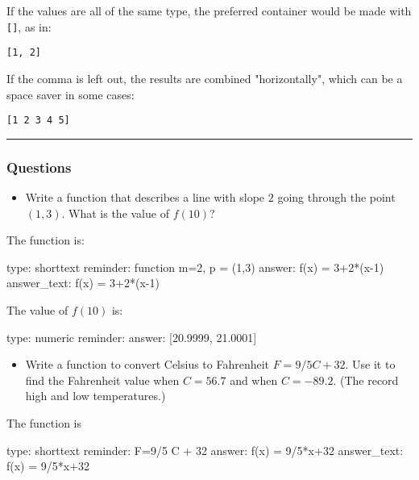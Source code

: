 \documentclass[12pt]{article}
\begin{document}
If the values are all of the same type, the preferred container would be
made with \texttt{{[}{]}}, as in:



\begin{verbatim}
[1, 2]
\end{verbatim}
If the comma is left out, the results are combined "horizontally", which
can be a space saver in some cases:



\begin{verbatim}
[1 2 3 4 5]
\end{verbatim}
\begin{center}\rule{3in}{0.4pt}\end{center}

\subsubsection{Questions}

\begin{itemize}
\itemsep1pt\parskip0pt
\item
  Write a function that describes a line with slope $2$ going through
  the point $(1,3)$. What is the value of $f(10)$?
\end{itemize}

The function is:

\begin{answer}
type: shorttext
reminder: function m=2, p = (1,3)
answer: f(x) = 3+2*(x-1)
answer_text: f(x) = 3+2*(x-1) 
\end{answer}

The value of $f(10)$ is:

\begin{answer}
    type: numeric
    reminder: 
    answer: [20.9999, 21.0001]

\end{answer}

\begin{itemize}
\itemsep1pt\parskip0pt
\item
  Write a function to convert Celsius to Fahrenheit $F=9/5 C +   32$.
  Use it to find the Fahrenheit value when $C=56.7$ and when $C=-89.2$.
  (The record high and low temperatures.)
\end{itemize}

The function is

\begin{answer}
type: shorttext
reminder: F=9/5 C + 32
answer: f(x) = 9/5*x+32
answer_text: f(x) =  9/5*x+32 
\end{answer}
\end{document}
